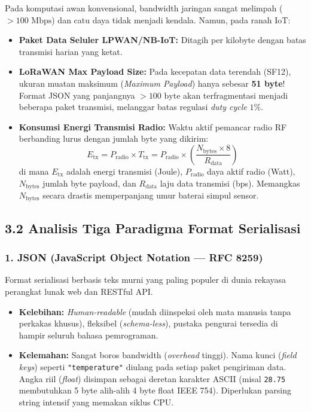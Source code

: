 \documentclass[11pt,a4paper]{article}
\begin{document}
Pada komputasi awan konvensional, bandwidth jaringan sangat melimpah ($>100\text{ Mbps}$) dan catu daya tidak menjadi kendala. Namun, pada ranah IoT:
\begin{itemize}
    \item \textbf{Paket Data Seluler LPWAN/NB-IoT:} Ditagih per kilobyte dengan batas transmisi harian yang ketat.
    \item \textbf{LoRaWAN Max Payload Size:} Pada kecepatan data terendah (SF12), ukuran muatan maksimum (\textit{Maximum Payload}) hanya sebesar \textbf{51 byte}! Format JSON yang panjangnya $>100\text{ byte}$ akan terfragmentasi menjadi beberapa paket transmisi, melanggar batas regulasi \textit{duty cycle} $1\%$.
    \item \textbf{Konsumsi Energi Transmisi Radio:} Waktu aktif pemancar radio RF berbanding lurus dengan jumlah byte yang dikirim:
    \begin{equation}
        E_{\text{tx}} = P_{\text{radio}} \times T_{\text{tx}} = P_{\text{radio}} \times \left(\frac{N_{\text{bytes}} \times 8}{R_{\text{data}}}\right)
    \end{equation}
    di mana $E_{\text{tx}}$ adalah energi transmisi (Joule), $P_{\text{radio}}$ daya aktif radio (Watt), $N_{\text{bytes}}$ jumlah byte payload, dan $R_{\text{data}}$ laju data transmisi (bps). Memangkas $N_{\text{bytes}}$ secara drastis memperpanjang umur baterai simpul sensor.
\end{itemize}

\subsection*{3.2 Analisis Tiga Paradigma Format Serialisasi}

\subsubsection*{1. JSON (JavaScript Object Notation --- RFC 8259)}
Format serialisasi berbasis teks murni yang paling populer di dunia rekayasa perangkat lunak web dan RESTful API.
\begin{itemize}
    \item \textbf{Kelebihan:} \textit{Human-readable} (mudah diinspeksi oleh mata manusia tanpa perkakas khusus), fleksibel (\textit{schema-less}), pustaka pengurai tersedia di hampir seluruh bahasa pemrograman.
    \item \textbf{Kelemahan:} Sangat boros bandwidth (\textit{overhead} tinggi). Nama kunci (\textit{field keys}) seperti \texttt{"temperature"} diulang pada setiap paket pengiriman data. Angka riil (\textit{float}) disimpan sebagai deretan karakter ASCII (misal \texttt{28.75} membutuhkan 5 byte alih-alih 4 byte float IEEE 754). Diperlukan parsing string intensif yang memakan siklus CPU.
\end{itemize}
\end{document}
